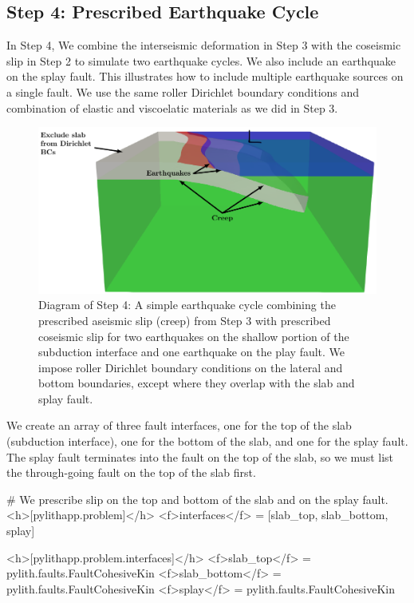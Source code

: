 \subsection{Step 4: Prescribed Earthquake Cycle}

In Step 4, We combine the interseismic deformation in Step 3 with the
coseismic slip in Step 2 to simulate two earthquake cycles. We also
include an earthquake on the splay fault. This illustrates how to
include multiple earthquake sources on a single fault. We use the same
roller Dirichlet boundary conditions and combination of elastic and
viscoelatic materials as we did in Step 3.

\begin{figure}[htbp]
  \includegraphics[width=5.0in]{examples/figs/subduction3d_step04_diagram}
  \caption{Diagram of Step 4: A simple earthquake cycle combining the
    prescribed aseismic slip (creep) from Step 3 with prescribed
    coseismic slip for two earthquakes on the shallow portion of the
    subduction interface and one earthquake on the play fault. We
    impose roller Dirichlet boundary conditions on the lateral and
    bottom boundaries, except where they overlap with the slab and
    splay fault.}
  \label{fig:example:subduction:3d:step04:diagram}
\end{figure}

We create an array of three fault interfaces, one for the top of the
slab (subduction interface), one for the bottom of the slab, and one
for the splay fault. The splay fault terminates into the fault on the
top of the slab, so we must list the through-going fault on the top of
the slab first.
\begin{cfg}
# We prescribe slip on the top and bottom of the slab and on the splay fault.
<h>[pylithapp.problem]</h>
<f>interfaces</f> = [slab_top, slab_bottom, splay]

<h>[pylithapp.problem.interfaces]</h>
<f>slab_top</f> = pylith.faults.FaultCohesiveKin
<f>slab_bottom</f> = pylith.faults.FaultCohesiveKin
<f>splay</f> = pylith.faults.FaultCohesiveKin
\end{cfg}

